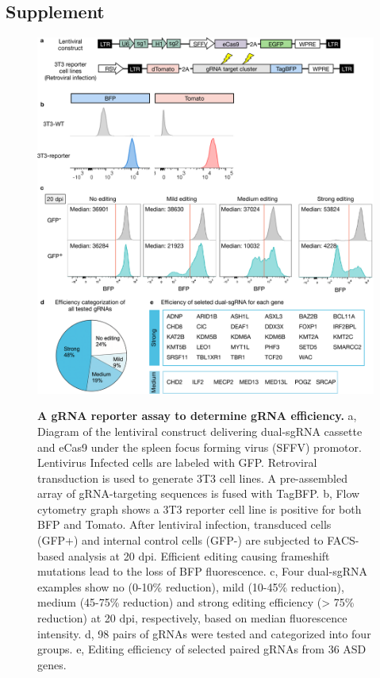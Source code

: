 \subsection{Supplement}
\beginsupplement

\begin{figure}[h!]
    \centering
	\includegraphics[width=\textwidth]{figures/asd/Figure_S1}
    \label{fig:asdS1}
    \caption{\textbf{A gRNA reporter assay to determine gRNA efficiency.} a, Diagram of the lentiviral construct delivering dual-sgRNA cassette and eCas9 under the spleen focus forming virus (SFFV) promotor. Lentivirus Infected cells are labeled with GFP. Retroviral transduction is used to generate 3T3 cell lines. A pre-assembled array of gRNA-targeting sequences is fused with TagBFP. b, Flow cytometry graph shows a 3T3 reporter cell line is positive for both BFP and Tomato. After lentiviral infection, transduced cells (GFP+) and internal control cells (GFP-) are subjected to FACS-based analysis at 20 dpi. Efficient editing causing frameshift mutations lead to the loss of BFP fluorescence. c, Four dual-sgRNA examples show no (0-10\% reduction), mild (10-45\% reduction), medium (45-75\% reduction) and strong editing efficiency (> 75\% reduction) at 20 dpi, respectively, based on median fluorescence intensity. d, 98 pairs of gRNAs were tested and categorized into four groups. e, Editing efficiency of selected paired gRNAs from 36 ASD genes.}
\end{figure}



